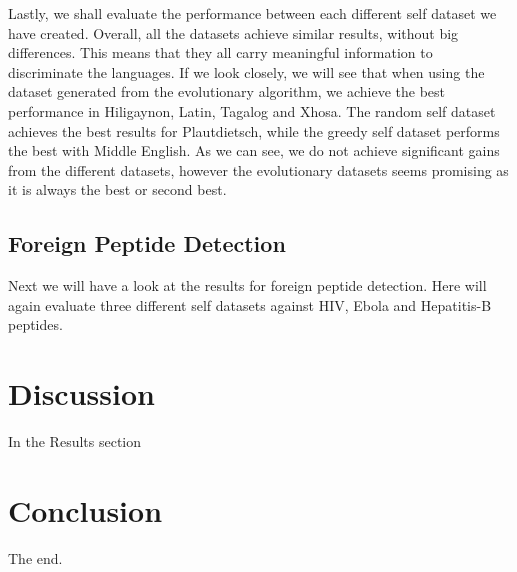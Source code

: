 \documentclass{article}
\begin{document}
Lastly, we shall evaluate the performance between each different self dataset we have created. Overall, all the datasets 
achieve similar results, without big differences. This means that they all carry meaningful information to 
discriminate the languages. If we look closely, we will see that when using the dataset generated from the evolutionary 
algorithm, we achieve the best performance in Hiligaynon, Latin, Tagalog and Xhosa. The random self dataset achieves the 
best results for Plautdietsch, while the greedy self dataset performs the best with Middle English. As we can see, we 
do not achieve significant gains from the different datasets, however the evolutionary datasets seems promising as it is 
always the best or second best.

\subsection{Foreign Peptide Detection}
Next we will have a look at the results for foreign peptide detection. Here will again evaluate three different self 
datasets against HIV, Ebola and Hepatitis-B peptides. 

\section{Discussion}
In the Results section 

\section{Conclusion}

The end.

\printbibliography

\appendix
\end{document}
